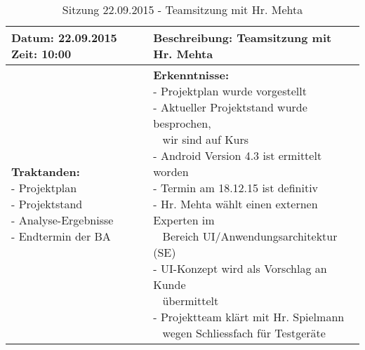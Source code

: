 \begin{table}[H]
\begin{tabularx}{\textwidth}{| l | X |}
\hline
\textbf{Datum:} 22.09.2015
\textbf{Zeit:} 10:00
&
\textbf{Beschreibung:} Teamsitzung mit Hr. Mehta \\ \hline
\specialcell[t]{
\textbf{Traktanden:}\\
- Projektplan\\
- Projektstand\\
- Analyse-Ergebnisse\\
- Endtermin der BA\\
}
& 
\specialcell[t]{
\textbf{Erkenntnisse:}\\
- Projektplan wurde vorgestellt\\
- Aktueller Projektstand wurde besprochen,\\~ wir sind auf Kurs\\
- Android Version 4.3 ist ermittelt worden\\
- Termin am 18.12.15 ist definitiv\\
- Hr. Mehta wählt einen externen Experten im\\~ Bereich UI/Anwendungsarchitektur (SE)\\
- UI-Konzept wird als Vorschlag an Kunde\\~ übermittelt\\
- Projektteam klärt mit Hr. Spielmann\\~ wegen Schliessfach für Testgeräte\\
}
\\ \hline
\end{tabularx}
\caption{Sitzung 22.09.2015 - Teamsitzung mit Hr. Mehta}
\end{table}


